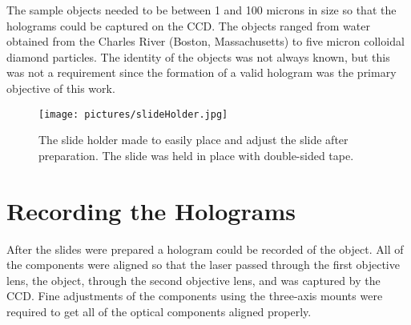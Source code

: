 The sample objects
needed to be between 1 and 100 microns in size so that the holograms could
be captured on the CCD\@. The objects ranged from water obtained from the
Charles River (Boston, Massachusetts) to five micron colloidal diamond
particles. The identity of the objects was not always known, but this was not
a requirement since the formation of a valid hologram was the primary objective
of this work.


\begin{figure}[htbp!]
\begin{center}
    \texttt{[image: pictures/slideHolder.jpg]}
\end{center}
\caption{The slide holder made to easily place and adjust the slide
after preparation. The slide was held in place with double-sided tape.}
\label{fig:slideHolder}
\end{figure}


\section{Recording the Holograms}

After the slides were prepared a hologram could be recorded of the object. 
All of the components were
aligned so that the laser passed through the first objective lens, the object,
through the second objective lens, and was captured by the CCD\@. Fine
adjustments of the components using the three-axis mounts were required to get all of the optical
components aligned properly.
%

